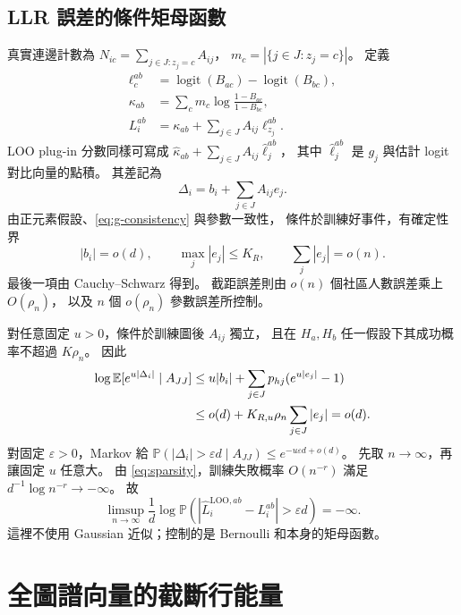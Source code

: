 \documentclass[11pt,a4paper]{article}
\theoremstyle{zhplain}
\numberwithin{equation}{section}
\newcommand{\E}{\mathbb E}
\newcommand{\PP}{\mathbb P}
\newcommand{\logit}{\operatorname{logit}}
\begin{document}
\subsection{LLR 誤差的條件矩母函數}
真實連邊計數為 \(N_{ic}=\sum_{j\in J:z_j=c}A_{ij}\)，
\(m_c=|\{j\in J:z_j=c\}|\)。
定義
\begin{align}
 \ell_c^{ab}
 &=\logit(B_{ac})-\logit(B_{bc}),\\
 \kappa_{ab}
 &=\sum_c m_c\log\frac{1-B_{ac}}{1-B_{bc}},\\
 L_i^{ab}
 &=\kappa_{ab}+\sum_{j\in J}A_{ij}\ell_{z_j}^{ab}.
 \label{eq:true-LLR}
\end{align}
LOO plug-in 分數同樣可寫成
\(\hat\kappa_{ab}+\sum_{j\in J}A_{ij}\hat\ell_j^{ab}\)，
其中 \(\hat\ell_j^{ab}\) 是 \(g_j\) 與估計 logit 對比向量的點積。
其差記為
\begin{equation}
 \Delta_i=b_i+\sum_{j\in J}A_{ij}e_j.
 \label{eq:LLR-difference}
\end{equation}
由正元素假設、\eqref{eq:g-consistency} 與參數一致性，
條件於訓練好事件，有確定性界
\begin{equation}
 |b_i|=o(d),\qquad
 \max_j|e_j|\le K_R,\qquad
 \sum_j|e_j|=o(n).
 \label{eq:LLR-coefficients}
\end{equation}
最後一項由 Cauchy--Schwarz 得到。
截距誤差則由 \(o(n)\) 個社區人數誤差乘上 \(O(\rho_n)\)，
以及 \(n\) 個 \(o(\rho_n)\) 參數誤差所控制。

對任意固定 \(u>0\)，條件於訓練圖後 \(A_{ij}\) 獨立，
且在 \(H_a,H_b\) 任一假設下其成功概率不超過 \(K\rho_n\)。
因此
\begin{align}
 \log\E[e^{u|\Delta_i|}\mid A_{JJ}]
 &\le u|b_i|+\sum_{j\in J}p_{hj}(e^{u|e_j|}-1)\notag\\
 &\le o(d)+K_{R,u}\rho_n\sum_{j\in J}|e_j|=o(d).
 \label{eq:mgf}
\end{align}
對固定 \(\varepsilon>0\)，Markov 給
\(\PP(|\Delta_i|>\varepsilon d\mid A_{JJ})
\le e^{-u\varepsilon d+o(d)}\)。
先取 \(n\to\infty\)，再讓固定 \(u\) 任意大。
由 \eqref{eq:sparsity}，訓練失敗概率 \(O(n^{-r})\)
滿足 \(d^{-1}\log n^{-r}\to-\infty\)。
故
\begin{equation}
 \limsup_{n\to\infty}\frac1d
 \log\PP\!\left(
 |\hat L_i^{\mathrm{LOO},ab}-L_i^{ab}|>\varepsilon d
 \right)=-\infty.
 \label{eq:loo-exponential}
\end{equation}
這裡不使用 Gaussian 近似；控制的是 Bernoulli 和本身的矩母函數。

\section{全圖譜向量的截斷行能量}
\label{sec:row-tail}
\end{document}
